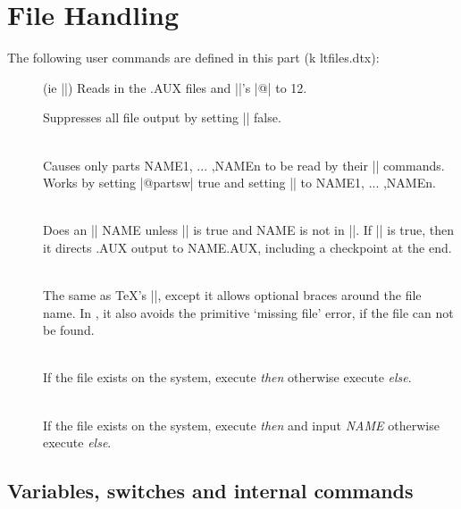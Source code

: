 
 \chapter{File Handling}
\label{ch:ltfiles}
\label{kernel:ltfiles}
 The following user commands are defined in this part (k ltfiles.dtx):

\begin{description}
\item[  ]
   (ie ||)
      Reads in the .AUX files and |\catcode|'s |@| to 12.
  

\item[]
       Suppresses all file output by setting |\@filesw| false.


\item[] \\
       Causes only parts NAME1, ... ,NAMEn to be read by
         their || commands.  Works by setting |@partsw| true
         and setting |\@partlist| to NAME1, ... ,NAMEn.
  

\item[]\\
        Does an || NAME unless |\@partsw| is true and
         NAME is not in |\@partlist|.  If |\@filesw| is true, then
         it directs .AUX output to NAME.AUX, including a
         checkpoint at the end.
  

\item[]\\
        The same as TeX's ||, except it allows optional
         braces around the file name. In \LaTeXe, it also avoids
         the primitive `missing file' error, if the file can not be
         found.
 

\item[]{}\\
   If the file exists on the system, execute \emph{then} otherwise
   execute \emph{else}.
 

\item[]{}\\
   If the file exists on the system, execute \emph{then} and input
   \emph{NAME}  otherwise execute \emph{else}.

\end{description}

\section{Variables, switches and internal commands}

